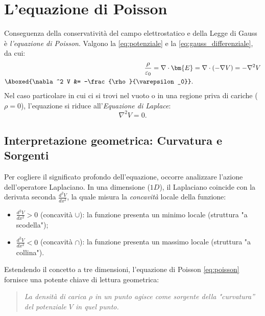 \documentclass[a4paper,11pt]{report}
\begin{document}
\section{L'equazione di Poisson}
Conseguenza della conservatività del campo elettrostatico e della Legge di Gauss è \textit{l'equazione di Poisson}. Valgono la \eqref{eq:potenziale} e la \eqref{eq:gauss_differenziale}, da cui:
\begin{equation}
\begin{aligned}
\frac{\rho}{\varepsilon_0} = \nabla \cdot \bm{E} &= \nabla \cdot (-\nabla V) = -\nabla^2 V \\
\Aboxed{\nabla^2 V &= -\frac{\rho}{\varepsilon_0}}.
\end{aligned}
\label{eq:poisson}
\end{equation}
Nel caso particolare in cui ci si trovi nel vuoto o in una regione priva di cariche ($\rho = 0$), l'equazione si riduce all'\textit{Equazione di Laplace}:
\begin{equation}
    \nabla^2 V = 0.
    \label{eq:laplace}
\end{equation}

\subsection{Interpretazione geometrica: Curvatura e Sorgenti}
Per cogliere il significato profondo dell'equazione, occorre analizzare l'azione dell'operatore Laplaciano.
In una dimensione ($1D$), il Laplaciano coincide con la derivata seconda $\frac{d^2 V}{dx^2}$, la quale misura la \textit{concavità} locale della funzione:
\begin{itemize}
    \item $\frac{d^2 V}{dx^2} > 0$ (concavità $\cup$): la funzione presenta un minimo locale (struttura "a scodella");
    \item $\frac{d^2 V}{dx^2} < 0$ (concavità $\cap$): la funzione presenta un massimo locale (struttura "a collina").
\end{itemize}
Estendendo il concetto a tre dimensioni, l'equazione di Poisson \eqref{eq:poisson} fornisce una potente chiave di lettura geometrica:
\begin{quote}
    \textit{La densità di carica $\rho$ in un punto agisce come sorgente della "curvatura'' del potenziale $V$ in quel punto.}
\end{quote}
\end{document}

